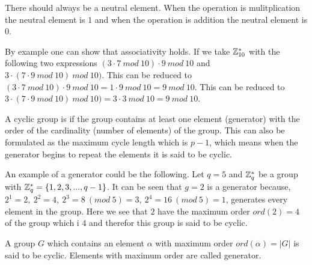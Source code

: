  There should always be a neutral element. When the operation is mulitplication the neutral element is $1$ and when the operation is addition the neutral element is $0$.

 By example one can show that associativity holds. If we take $ \mathbb{Z}_{10}^*$ with the following two expressions $ (3 \cdot 7 \ mod \ 10) \cdot 9 \ mod \ 10 $ and  $ 3 \cdot ( 7 \cdot 9 \ mod \ 10) \ mod \ 10) $. This can be reduced to $ (3 \cdot 7 \ mod \ 10) \cdot 9 \ mod \ 10 = 1 \cdot 9 \ mod \ 10 = 9 \ mod \ 10$. This can be reduced to $ 3 \cdot ( 7 \cdot 9 \ mod \ 10) \ mod \ 10) = 3 \cdot 3 \ mod \ 10 = 9 \ mod \ 10 $.



 A cyclic group is if the group contains at least one element (generator) with the order of the cardinality (number of elements) of the group. This can also be formulated as the maximum cycle length which is $p-1$, which means when the generator begins to repeat the elements it is said to be cyclic.

 An example of a generator could be the following. Let \begin{math}q=5\end{math} and \begin{math} \mathbb{Z}_q^*\end{math} be a group with \begin{math} \mathbb{Z}_q^* = \{1,2,3,...,q-1\}\end{math}. It can be seen that \begin{math} g=2\end{math} is a generator because,  \begin{math}2^1=2,\ 2^2=4,\ 2^3=8 \ (mod\ 5)=3,\ 2^4=16 \ (mod \ 5)=1 \end{math}, generates every element in the group. Here we see that $2$ have the maximum order $ord(2)=4$ of the group which i $4$ and therefor this group is said to be cyclic.

\begin{defi}
A group $G$ which contains an element $ \alpha $ with maximum order $ord( \alpha ) = |G|$ is said to be cyclic. Elements with maximum order are called generator.
\end{defi}



